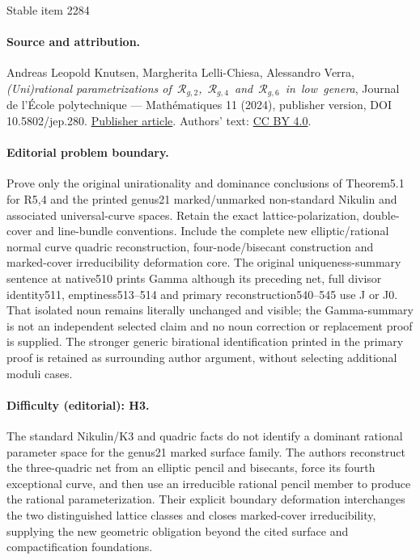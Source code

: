 \documentclass[11pt]{article}
\theoremstyle{plain}
\theoremstyle{definition}
\begin{document}
\begin{center}{\Large Stable item 2284}\end{center}
\paragraph{Source and attribution.}
Andreas Leopold Knutsen, Margherita Lelli-Chiesa, Alessandro Verra, \emph{(Uni)rational parametrizations of $\mathcal{R}_{g,2}$, $\mathcal{R}_{g,4}$ and $\mathcal{R}_{g,6}$ in low genera}, Journal de l’École polytechnique — Mathématiques 11 (2024), publisher version, DOI 10.5802/jep.280. \href{https://jep.centre-mersenne.org/articles/10.5802/jep.280/}{Publisher article}. Authors' text: \href{https://creativecommons.org/licenses/by/4.0/}{CC BY 4.0}.
\paragraph{Editorial problem boundary.}
Prove only the original unirationality and dominance conclusions of Theorem5.1 for R5,4 and the printed genus21 marked/unmarked non-standard Nikulin and associated universal-curve spaces. Retain the exact lattice-polarization, double-cover and line-bundle conventions. Include the complete new elliptic/rational normal curve quadric reconstruction, four-node/bisecant construction and marked-cover irreducibility deformation core. The original uniqueness-summary sentence at native510 prints Gamma although its preceding net, full divisor identity511, emptiness513–514 and primary reconstruction540–545 use J or J0. That isolated noun remains literally unchanged and visible; the Gamma-summary is not an independent selected claim and no noun correction or replacement proof is supplied. The stronger generic birational identification printed in the primary proof is retained as surrounding author argument, without selecting additional moduli cases.
\paragraph{Difficulty (editorial): H3.}
The standard Nikulin/K3 and quadric facts do not identify a dominant rational parameter space for the genus21 marked surface family. The authors reconstruct the three-quadric net from an elliptic pencil and bisecants, force its fourth exceptional curve, and then use an irreducible rational pencil member to produce the rational parameterization. Their explicit boundary deformation interchanges the two distinguished lattice classes and closes marked-cover irreducibility, supplying the new geometric obligation beyond the cited surface and compactification foundations.
\end{document}
